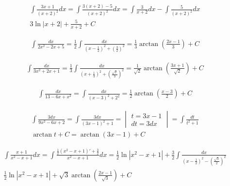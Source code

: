 \begin{gather*}\int \frac{3x+1}{(x+2)^2}dx = \int \frac{3(x+2)-5}{(x+2)^2}dx = \int \frac{3}{x+2}dx - \int \frac{5}{(x+2)^2}dx \\
 3\ln|x+2|+\frac{5}{x+2}+C\end{gather*}



\begin{gather*}
  \int \frac{dx}{2x^2-2x+5}
  = \frac{1}{2}\int \frac{dx}{(x-\frac{1}{2})^2+(\frac{3}{2})^2}
  = \frac{1}{3}\arctan \left(\frac{2x-1}{3}\right)+C
\end{gather*}




\begin{gather*}\int \frac{dx}{3x^2+2x+1} = \frac{1}{3} \int \frac{dx}{(x+\frac{1}{3})^2+(\frac{\sqrt{2}}{3})^2} = \frac{1}{\sqrt{2}}\arctan \left( \frac{3x+1}{\sqrt{2}}\right)+C\end{gather*}



\begin{gather*}\int \frac{dx}{13-6x+x^2}=\int \frac{dx}{(x-3)^2+2^2}=\frac{1}{2}\arctan \left(\frac{x-3}{2}\right)+C\end{gather*}



\begin{gather*}\int \frac{3dx}{9x^2-6x+2}=\int \frac{3dx}{(3x-1)^2+1} = \begin{vmatrix} t=3x-1 \\ dt=3dx \end{vmatrix} = \int \frac{dt}{t^2+1} \\
 \arctan t + C = \arctan (3x-1)+C\end{gather*}



\begin{gather*}\int \frac{x+1}{x^2-x+1}dx = \int \frac{\frac{1}{2}(x^2-x+1)'+\frac{3}{2}}{x^2-x+1}dx = \frac{1}{2}\ln|x^2-x+1|+\frac{3}{2}\int \frac{dx}{(x-\frac{1}{2})^2-(\frac{\sqrt{3}}{2})^2} \\
 \frac{1}{2}\ln|x^2-x+1|+\sqrt{3}\arctan \left(\frac{2x-1}{\sqrt{3}}\right)+C\end{gather*}


